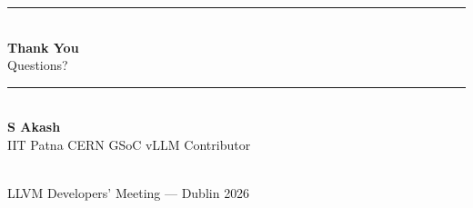 \documentclass[aspectratio=169,10pt]{beamer}
\begin{document}
\begin{frame}[plain]
  \vfill
  \begin{center}
    {\color{LLVMorange}\rule{0.5\textwidth}{2pt}}\\[1.5em]
    {\Huge\color{LLVMblue}\textbf{Thank You}}\\[1em]
    {\Large\color{LLVMdark} Questions?}\\[2em]
    {\color{LLVMorange}\rule{0.3\textwidth}{1pt}}\\[1.5em]
    {\large\textbf{S Akash}}\\[0.3em]
    {\color{LLVMgray} IIT Patna \;\textbar\; CERN GSoC \;\textbar\; vLLM Contributor}\\[1em]
    \\[1em]
    {\small\color{LLVMgray} LLVM Developers' Meeting --- Dublin 2026}
  \end{center}
  \vfill
\end{frame}
\end{document}
